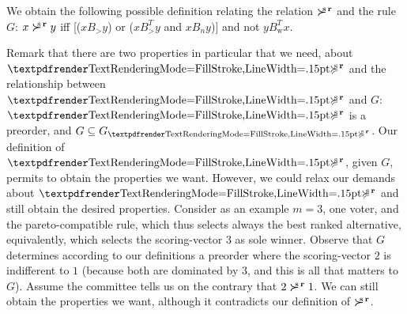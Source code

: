 \documentclass[version=last, pagesize, twoside=off, bibliography=totoc, DIV=calc, fontsize=14pt, a4paper, french, english]{scrartcl}
\begin{document}
We obtain the following possible definition relating the relation $\mathrel{\boldsymbol{\succ}^{\text{\!\!\!s}\textbf{\,r}}}$ and the rule $G$: $x \mathrel{\boldsymbol{\succ}^{\text{\!\!\!s}\textbf{\,r}}} y$ iff [($x B_> y$) or ($x B_>^T y$ and $x B_n y$)] and not $y B_\text{w}^T x$.


Remark that there are two properties in particular that we need, about $\prefsv$ and the relationship between $\prefsv$ and $G$: $\prefsv$ is a preorder, and $G \subseteq G_{\prefsv}$. Our definition of $\prefsv$, given $G$, permits to obtain the properties we want. However, we could relax our demands about $\prefsv$ and still obtain the desired properties. Consider as an example $m = 3$, one voter, and the pareto-compatible rule, which thus selects always the best ranked alternative, equivalently, which selects the scoring-vector $3$ as sole winner. Observe that $G$ determines according to our definitions a preorder where the scoring-vector $2$ is indifferent to $1$ (because both are dominated by $3$, and this is all that matters to $G$). Assume the committee tells us on the contrary that $2 \mathrel{\boldsymbol{\succ}^{\text{\!\!\!s}\textbf{\,r}}} 1$. We can still obtain the properties we want, although it contradicts our definition of $\mathrel{\boldsymbol{\succ}^{\text{\!\!\!s}\textbf{\,r}}}$.
\end{document}

